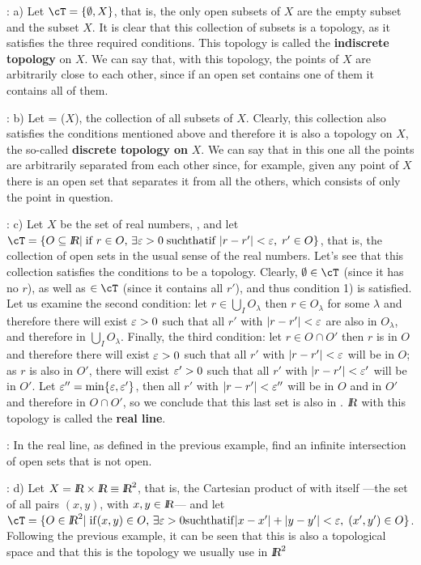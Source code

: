 \ejem: a) Let $\cT = \{\emptyset, X\}$, that is, the only open subsets of $X$ are the empty subset and the subset $X$. It is clear that this collection of subsets is a topology, as it satisfies the three required conditions. This topology is called the {\bf indiscrete topology} on $X$. We can say that, with this topology, the points of $X$ are arbitrarily close to each other, since if an open set contains one of them it contains all of them.

\ejem: b) Let \cT = \cP($X$), the collection of all subsets of $X$. Clearly, this collection also satisfies the conditions mentioned above and therefore it is also a topology on $X$, the so-called {\bf discrete topology on} $X$. We can say that in this one all the points are arbitrarily separated from each other since, for example, given any point of $X$ there is an open set that separates it from all the others, which consists of only the point in question.

\ejem: c) Let $X$ be the set of real numbers, \re, and let \\
$\cT = \{O \subseteq \re |\; \mathrm{if} \;r \in O, \, \exists \eps >0 \; \mathrm{such that if} \; |r - r'| < \eps, \; r' \in O\}$, that is, the collection of open sets in the usual sense of the real numbers. Let's see that this collection satisfies the conditions to be a topology. Clearly, $\emptyset \in \cT$ (since it has no $r$), as well as \re$ \in \cT$ (since it contains all $r'$), and thus condition 1) is satisfied. Let us examine the second condition: let $r \in \bigcup_I O_{\lambda}$ then $r \in O_{\lambda}$ for some $\lambda$ and therefore there will exist $\mbox{$\varepsilon$} >0 $ such that all $r'$ with $|r-r'| < \mbox{$\varepsilon$} $ are also in $O_{\lambda}$, and therefore in $\bigcup_I O_{\lambda}$. 
Finally, the third condition: let $r \in O \cap O'$ then $r$ is in $O$ and therefore there will exist $\mbox{$\varepsilon$} > 0$ such that all $r'$ with $|r-r'| < \mbox{$\varepsilon$} $ will be in $O$; as $r$ is also in $O'$, there will exist $\mbox{$\varepsilon$}'> 0$ such that all $r'$ with $|r-r'| < \mbox{$\varepsilon$}'$ will be in $O'$. 
Let $\mbox{$\varepsilon$}'' = \mathrm{min}\{\mbox{$\varepsilon$}, \mbox{$\varepsilon$}' \}$, then all $r'$ with $|r-r'| < \mbox{$\varepsilon$}''$ will be in $O$ and in $O'$ and therefore in $O \cap O'$, so we conclude that this last set is also in \cT. $\mbox{\sl {l$\!\!\!\;\:\!$R}}$ with this topology is called the {\bf real line}.

\ejer: In the real line, as defined in the previous example, find an infinite intersection of open sets that is not open.

\ejem: d) Let $X = \re \times \re \equiv \re^2$, that is, the Cartesian product of \re  with itself ---the set of all pairs $(x,y)$, with $x,y \in \mbox{\sl {l$\!\!\!\;\:\!$R}}$--- and let \\
$\cT = \{O \in \re^2 |\; \mathrm{if} (x,y) \in O, \, \exists \eps >0 \mathrm{such that if} |x - x'|+|y-y'| < \eps, \; (x',y') \in O \}$. Following the previous example, it can be seen that this is also a topological space and that this is the topology we usually use in $\mbox{\sl {l$\!\!\!\;\:\!$R}}^2$

